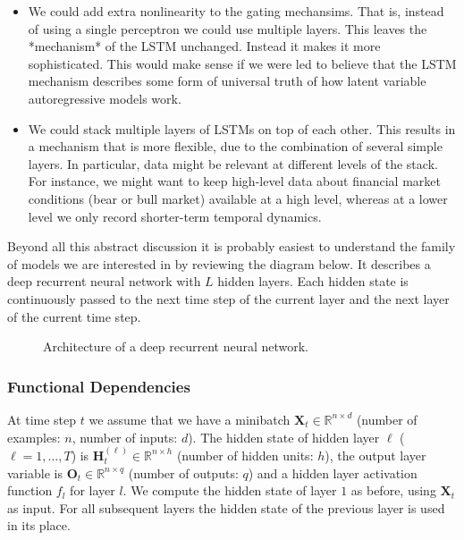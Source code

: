 \begin{itemize}
    \item We could add extra nonlinearity to the gating mechansims. That is, instead of using a single perceptron we could use multiple layers. This leaves the *mechanism* of the LSTM unchanged. Instead it makes it more sophisticated. This would make sense if we were led to believe that the LSTM mechanism describes some form of universal truth of how latent variable autoregressive models work.
    \item We could stack multiple layers of LSTMs on top of each other. This results in a mechanism that is more flexible, due to the combination of several simple layers. In particular, data might be relevant at different levels of the stack. For instance, we might want to keep high-level data about financial market conditions (bear or bull market) available at a high level, whereas at a lower level we only record shorter-term temporal dynamics.
\end{itemize}

Beyond all this abstract discussion it is probably easiest to understand the family of models we are interested in by reviewing the diagram below. It describes a deep recurrent neural network with $L$ hidden layers. Each hidden state is continuously passed to the next time step of the current layer and the next layer of the current time step.

\begin{figure}[hpt]
	\centering
	
	\caption{Architecture of a deep recurrent neural network.}
	\label{fig:deep-rnn}
\end{figure}

\subsubsection{Functional Dependencies}

At time step $t$ we assume that we have a minibatch $\mathbf{X}_t \in \mathbb{R}^{n \times d}$ (number of examples: $n$, number of inputs: $d$). The hidden state of hidden layer $\ell$ ($\ell=1,\ldots,T$) is $\mathbf{H}_t^{(\ell)}  \in \mathbb{R}^{n \times h}$ (number of hidden units: $h$), the output layer variable is $\mathbf{O}_t \in \mathbb{R}^{n \times q}$ (number of outputs: $q$) and a hidden layer activation function $f_l$ for layer $l$. We compute the hidden state of layer $1$ as before, using $\mathbf{X}_t$ as input. For all subsequent layers the hidden state of the previous layer is used in its place.

